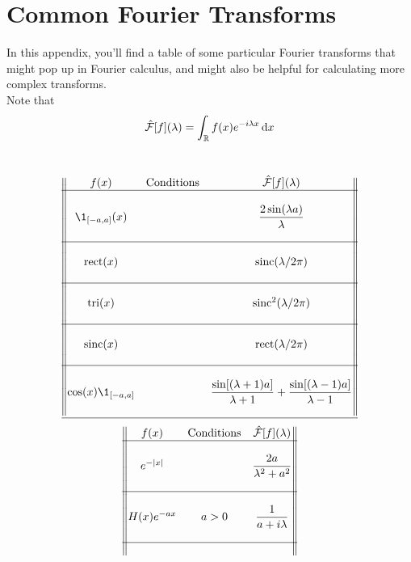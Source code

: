 \documentclass[../complete.tex]{subfiles}
\begin{document}
\section{Common Fourier Transforms}
In this appendix, you'll find a table of some particular Fourier transforms that might pop up in Fourier calculus, and might also be helpful for calculating more complex transforms.\\
Note that
\begin{equation}
	\hat{\mathcal{F}}[f](\lambda)=\int_{\mathbb{R}} f(x)e^{-i\lambda x}\operatorname{d\!} x
\end{equation}
\\
\begin{center}
\begin{equation*}
	\begin{Vmatrix}
		f(x) &\text{Conditions}& \fou[f](\lambda) \\
		\hline\\
		\1_{[-a,a]}(x) && \dfrac{2\sin(\lambda a)}{\lambda} \\
		\\\hline\\
		 \mathrm{rect}(x) && \mathrm{sinc}(\lambda/2\pi) \\
		\\\hline\\
		 \mathrm{tri}(x) && \mathrm{sinc}^2(\lambda/2\pi) \\
		\\\hline\\
		 \mathrm{sinc}(x) && \mathrm{rect}(\lambda/2\pi) \\
		\\\hline\\
		\cos(x)\1_{[-a,a]} && \dfrac{\sin[(\lambda+1)a]}{\lambda+1}+\dfrac{\sin[(\lambda-1)a]}{\lambda-1} \\
		\\\hline
	\end{Vmatrix}
\end{equation*}
\begin{equation*}
	\begin{Vmatrix}
		f(x) & \text{Conditions} & \hat{\mathcal{F}}[f](\lambda) \\
		\hline\\
		e^{-\abs{x}} & & \dfrac{2a}{\lambda^2+a^2} \\
		\\\hline\\
		H(x)e^{-ax} & a>0 & \dfrac{1}{a+i\lambda}\\
		\\\hline\\

\end{Vmatrix}
\end{equation*}
\end{center}
\end{document}
